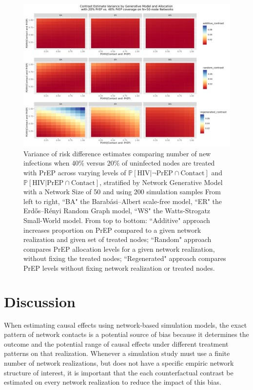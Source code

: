\documentclass{article}
\theoremstyle{definition}
\begin{document}
\begin{figure}[H]
    \centering
    \includegraphics[width=\linewidth]{Corrected Figures/Generative Model Variance Plot.png}
    \caption{Variance of risk difference estimates comparing number of new infections when 40\% versus 20\% of uninfected nodes are treated with PrEP across varying levels of $\mathbb{P}\left[\text{HIV} \vert \neg \text{PrEP} \cap \text{Contact}\right]$ and $\mathbb{P}\left[\text{HIV} \vert \text{PrEP} \cap \text{Contact}\right]$, stratified by Network Generative Model with a Network Size of 50 and using 200 simulation samples %
    From left to right, ``BA" the Barabási–Albert scale-free model, ``ER" the Erdős–Rényi Random Graph model, ``WS" the Watts-Strogatz Small-World model. From top to bottom: ``Additive" approach increases proportion on PrEP compared to a given network realization and given set of treated nodes; ``Random" approach compares PrEP allocation levels for a given network realization, without fixing the treated nodes; ``Regenerated" approach compares PrEP levels without fixing network realization or treated nodes. 
    }
    \label{fig:Figure 13}
\end{figure}


\section{Discussion}

 When estimating causal effects using network-based simulation models, the exact pattern of network contacts is a potential source of bias because it determines the outcome and the potential range of causal effects under different treatment patterns on that realization. Whenever a simulation study must use a finite number of network realizations, but does not have a specific empiric network structure of interest, it is important that the each counterfactual contrast be estimated on every network realization to reduce the impact of this bias. 
\end{document}
